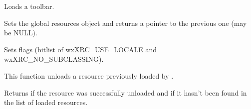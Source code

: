 Loads a toolbar.


\label{wxxmlresourceset}


Sets the global resources object and returns a pointer to the previous one (may be NULL).


\label{wxxmlresourcesetflags}


Sets flags (bitlist of wxXRC\_USE\_LOCALE and wxXRC\_NO\_SUBCLASSING).


\label{wxxmlresourceunload}


This function unloads a resource previously loaded by 
.

Returns \true if the resource was successfully unloaded and \false if it hasn't
been found in the list of loaded resources.

